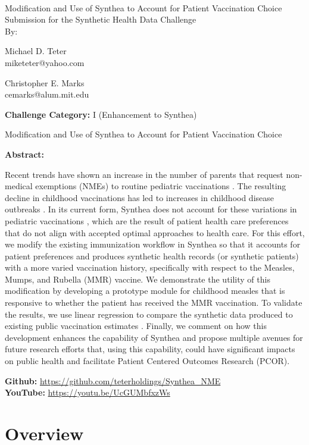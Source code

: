 \documentclass[12pt]{article}
\newcommand{\solutiontitle}{Modification and Use of Synthea to Account for Patient Vaccination Choice}
\newcommand{\challengecategory}{I (Enhancement to Synthea)}
\newcommand{\ABSTRACT}{
	Recent trends have shown an increase in the number of parents that request non-medical exemptions (NMEs) to routine pediatric vaccinations \cite{latimes-antivax,antivax}.  The resulting decline in childhood vaccinations has led to increases in childhood disease outbreaks \cite{antivax-data}.  In its current form, Synthea \cite{synthea} does not account for these variations in pediatric vaccinations \cite[p. 15]{challenge-webinar-slides}, which are the result of patient health care preferences that do not align with accepted optimal approaches to health care.  
    For this effort, we modify the existing immunization workflow in Synthea so that it accounts for patient preferences and produces synthetic health records (or synthetic patients) with a more varied vaccination history, specifically with respect to the Measles, Mumps, and Rubella (MMR) vaccine.  We demonstrate the utility of this modification by developing a prototype module for childhood measles that is responsive to whether the patient has received the MMR vaccination.  To validate the results, we use linear regression to compare the synthetic data produced to existing public vaccination estimates \cite{antivax-data}.  Finally, we comment on how this development enhances the capability of Synthea and propose multiple avenues for future research efforts that, using this capability, could have significant impacts on public health and facilitate Patient Centered Outcomes Research (PCOR).
}
\begin{document}

\thispagestyle{empty}

~

\begin{center}
    {\huge \solutiontitle} \\[24pt]
    {\Large Submission for the Synthetic Health Data Challenge} \\[24pt]
    {\Large By:} \\[24pt]
\end{center}

\begin{multicols}{2}
\begin{center}
	Michael D. Teter\\
	miketeter@yahoo.com
\end{center}

\columnbreak

\begin{center}
    Christopher E. Marks\\
    cemarks@alum.mit.edu
\end{center}
\end{multicols}



\noindent \textbf{Challenge Category:} \challengecategory
\\


\clearpage



\setcounter{page}{1}

\begin{center}
    {\LARGE \solutiontitle}
    \\[11pt]
    \begin{minipage}{0.9\textwidth}
      \textbf{Abstract:}
      \ABSTRACT
    \end{minipage}
\end{center}

\noindent \textbf{Github:} \url{https://github.com/teterholdings/Synthea_NME}\\
\noindent \textbf{YouTube:} \url{https://youtu.be/UcGUMbfxzWs}
  
\section{Overview}
\end{document}

